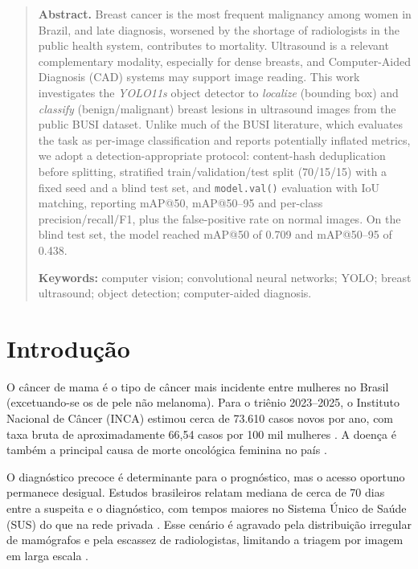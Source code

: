 \documentclass[11pt,a4paper]{article}
\begin{document}
\begin{quote}\small
\textbf{Abstract.} Breast cancer is the most frequent malignancy among women in
Brazil, and late diagnosis, worsened by the shortage of radiologists in the
public health system, contributes to mortality. Ultrasound is a relevant
complementary modality, especially for dense breasts, and Computer-Aided
Diagnosis (CAD) systems may support image reading. This work investigates the
\emph{YOLO11s} object detector to \emph{localize} (bounding box) and
\emph{classify} (benign/malignant) breast lesions in ultrasound images from the
public BUSI dataset. Unlike much of the BUSI literature, which evaluates the task
as per-image classification and reports potentially inflated metrics, we adopt a
detection-appropriate protocol: content-hash deduplication before splitting,
stratified train/validation/test split (70/15/15) with a fixed seed and a blind
test set, and \texttt{model.val()} evaluation with IoU matching, reporting
mAP@50, mAP@50--95 and per-class precision/recall/F1, plus the false-positive
rate on normal images. On the blind test set, the model reached mAP@50 of 0.709
and mAP@50--95 of 0.438.

\noindent\textbf{Keywords:} computer vision; convolutional neural networks;
YOLO; breast ultrasound; object detection; computer-aided diagnosis.
\end{quote}

\section{Introdução}\label{sec:intro}

O câncer de mama é o tipo de câncer mais incidente entre mulheres no Brasil
(excetuando-se os de pele não melanoma). Para o triênio 2023--2025, o Instituto
Nacional de Câncer (INCA) estimou cerca de 73.610 casos novos por ano, com taxa
bruta de aproximadamente 66{,}54 casos por 100 mil mulheres \citep{inca2023}. A
doença é também a principal causa de morte oncológica feminina no país
\citep{inca2024}.

O diagnóstico precoce é determinante para o prognóstico, mas o acesso oportuno
permanece desigual. Estudos brasileiros relatam mediana de cerca de 70 dias entre
a suspeita e o diagnóstico, com tempos maiores no Sistema Único de Saúde (SUS) do
que na rede privada \citep{campos2022}. Esse cenário é agravado pela distribuição
irregular de mamógrafos e pela escassez de radiologistas, limitando a triagem por
imagem em larga escala \citep{inca2024}.
\end{document}
